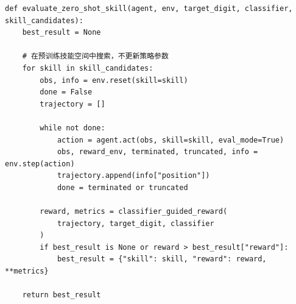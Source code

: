 \documentclass[UTF8,a4paper,12pt]{ctexart}
\begin{document}
\begin{lstlisting}[caption={Supplement 2 zero-shot skill evaluation},label={lst:supp-drone-zeroshot}]
def evaluate_zero_shot_skill(agent, env, target_digit, classifier, skill_candidates):
    best_result = None

    # 在预训练技能空间中搜索，不更新策略参数
    for skill in skill_candidates:
        obs, info = env.reset(skill=skill)
        done = False
        trajectory = []

        while not done:
            action = agent.act(obs, skill=skill, eval_mode=True)
            obs, reward_env, terminated, truncated, info = env.step(action)
            trajectory.append(info["position"])
            done = terminated or truncated

        reward, metrics = classifier_guided_reward(
            trajectory, target_digit, classifier
        )
        if best_result is None or reward > best_result["reward"]:
            best_result = {"skill": skill, "reward": reward, **metrics}

    return best_result
\end{lstlisting}
\end{document}
